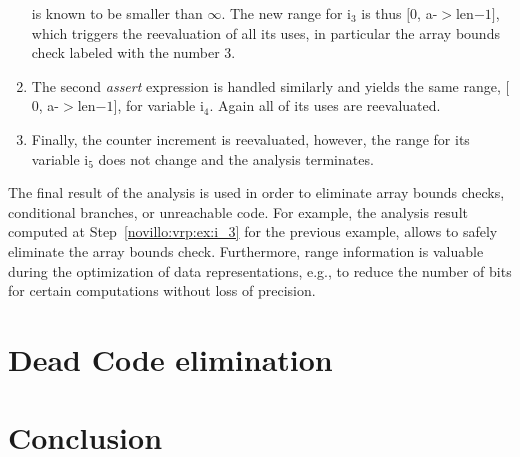 \begin{enumerate}
      is known to be smaller than $\infty$. The new range for i$_3$ is thus
      $[$0, a-$>$len$ - 1]$, which triggers the reevaluation of all its uses,
      in particular the array bounds check labeled with the number $3$.
\item The second \emph{assert} expression is handled similarly and yields the
      same range, $[$0, a-$>$len$ - 1]$, for variable i$_4$. Again all of its
      uses are reevaluated.
\item Finally, the counter increment is reevaluated, however, the range for its
      variable i$_5$ does not change and the analysis terminates.
\end{enumerate}

The final result of the analysis is used in order to eliminate array bounds
checks, conditional branches, or unreachable code. For example, the analysis
result computed at Step~\ref{novillo:vrp:ex:i_3} for the previous example,
allows to safely eliminate the array bounds check. Furthermore, range
information is valuable during the optimization of data representations, e.g.,
to reduce the number of bits for certain computations without loss of precision.

\section{Dead Code elimination}
\label{novillo:sec:dead_code_elimination}

\section{Conclusion}
\label{novillo:sec:conclusion}

